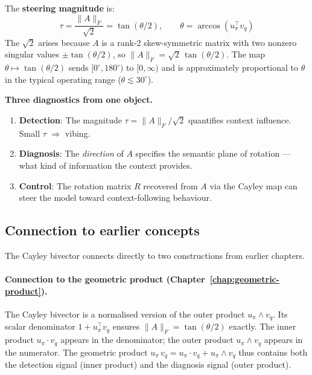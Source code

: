 \documentclass[11pt, twoside, openright]{memoir}
\newcommand{\gp}{\,}              %
\newcommand{\ip}{\cdot}           %
\newcommand{\op}{\wedge}          %
\numberwithin{equation}{chapter}
\begin{document}
The \textbf{steering magnitude} is:
\begin{equation}
  \tau = \frac{\|A\|_F}{\sqrt{2}} = \tan(\theta/2), \qquad
  \theta = \arccos(u_\pi^\top v_q)
\end{equation}
The $\sqrt{2}$ arises because $A$ is a rank-2 skew-symmetric matrix
with two nonzero singular values $\pm\tan(\theta/2)$, so
$\|A\|_F = \sqrt{2}\,\tan(\theta/2)$.
The map $\theta \mapsto \tan(\theta/2)$ sends
$[0^\circ, 180^\circ)$ to $[0, \infty)$ and is approximately
proportional to $\theta$ in the typical operating range
($\theta \lesssim 30^\circ$).

\begin{keyidea}
\textbf{Three diagnostics from one object.}
\begin{enumerate}[nosep]
\item \textbf{Detection}: The magnitude
  $\tau = \|A\|_F / \sqrt{2}$ quantifies context influence.
  Small $\tau$ $\Rightarrow$ vibing.
\item \textbf{Diagnosis}: The \emph{direction} of $A$
  specifies the semantic plane of rotation --- what kind of
  information the context provides.
\item \textbf{Control}: The rotation matrix $R$ recovered from
  $A$ via the Cayley map can steer the model toward
  context-following behaviour.
\end{enumerate}
\end{keyidea}

\subsection{Connection to earlier concepts}

The Cayley bivector connects directly to two constructions from
earlier chapters.

\paragraph{Connection to the geometric product (Chapter~\ref{chap:geometric-product}).}
The Cayley bivector is a normalised version of the outer product
$u_\pi \op v_q$.  Its scalar denominator $1 + u_\pi^\top v_q$ ensures
$\|A\|_F = \tan(\theta/2)$ exactly.  The inner product
$u_\pi \ip v_q$ appears in the denominator; the outer product
$u_\pi \op v_q$ appears in the numerator.  The geometric product
$u_\pi \gp v_q = u_\pi \ip v_q + u_\pi \op v_q$ thus contains both
the detection signal (inner product) and the diagnosis signal (outer
product).
\end{document}
